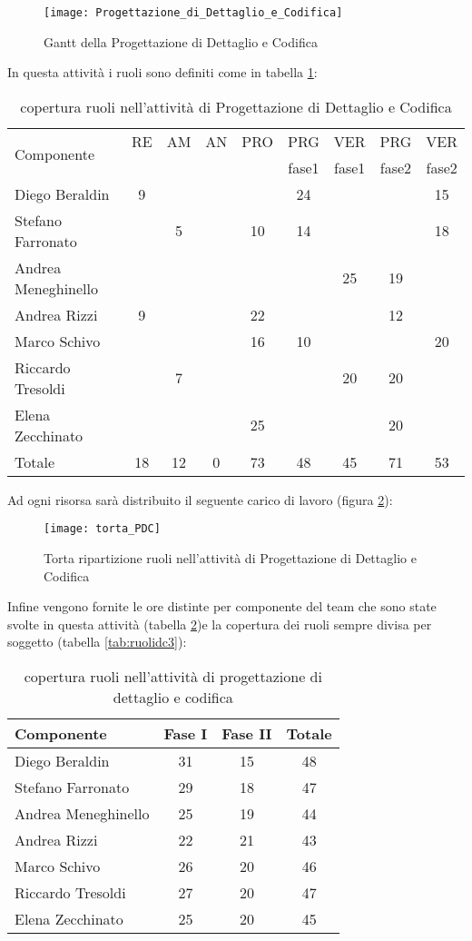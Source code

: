 \begin{figure}[h!]
  \texttt{[image: Progettazione\_di\_Dettaglio\_e\_Codifica]}
\caption{Gantt della Progettazione di Dettaglio e Codifica}\label{fig:gantdc}
\end{figure}

In questa attività i ruoli sono definiti come in tabella \ref{tab:ruolidc}:

\begin{table}[h!]
\centering
\begin{tabular}{|l|c|c|c|c|c|c|c|c|}
\hline
\multirow{2}{*}{Componente}& RE& AM& AN& PRO& PRG&VER& PRG& VER \\
					      &    &     &      &        & fase1&fase1&fase2&fase2\\
\hline
Diego Beraldin & 9& & & & 24& & & 15\\
Stefano Farronato & & 5& & 10&14 & & & 18\\
Andrea Meneghinello & & & & & & 25& 19& \\
Andrea Rizzi & 9& & & 22& & & 12& \\
Marco Schivo & & & & 16& 10& & & 20\\
Riccardo Tresoldi & & 7& & & & 20& 20& \\
Elena Zecchinato & & & & 25& & & 20& \\
\hline
Totale & 18& 12& 0& 73& 48& 45& 71& 53\\
\hline
\end{tabular}
\caption{copertura ruoli nell'attività di Progettazione di Dettaglio e Codifica}\label{tab:ruolidc}
\end{table}
\clearpage

Ad ogni risorsa sarà distribuito il seguente carico di lavoro (figura \ref{fig:ruolidc}):

\begin{figure}[h!]
\centering
  \texttt{[image: torta\_PDC]}
\caption{Torta ripartizione ruoli nell'attività di Progettazione di Dettaglio e Codifica}\label{fig:ruolidc}
\end{figure}

Infine vengono fornite le ore distinte per componente del team che sono state svolte in questa attività (tabella \ref{tab:ruolidc2})e la copertura dei ruoli sempre divisa per soggetto (tabella \ref{tab:ruolidc3}):

\begin{table}[h]
\centering
\begin{tabular}{|l|c|c|c|}
\hline
Componente& Fase I& Fase II& Totale\\
\hline
Diego Beraldin & 31& 15& 48\\
Stefano Farronato & 29& 18& 47\\
Andrea Meneghinello & 25& 19& 44\\
Andrea Rizzi &22 &21 & 43\\
Marco Schivo & 26& 20& 46\\
Riccardo Tresoldi & 27& 20& 47\\
Elena Zecchinato & 25& 20& 45\\
\hline
\end{tabular}
\caption{copertura ruoli nell'attività di progettazione di dettaglio e codifica}\label{tab:ruolidc2}
\end{table}

